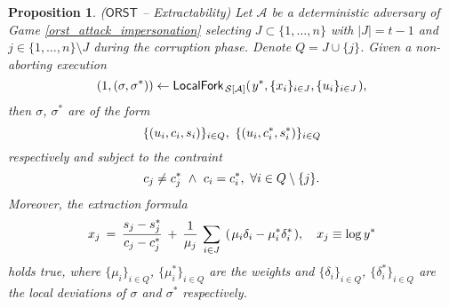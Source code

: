 \documentclass[psamsfonts, reqno]{amsart}
\newtheorem{prop}[thm]{Proposition}
\theoremstyle{definition}
\theoremstyle{remark}
\numberwithin{equation}{section}
\begin{document}
\begin{prop}\label{orst_extractability_prop}
\textup{($\mathsf{ORST}$ -- \textup{Extractability})}
Let $\mathcal{A}$ be a deterministic adversary of
Game \ref{orst_attack_impersonation}
selecting $J \subset \{1, \dots, n\}$ with $|J| = t-1$
and $j \in \{1, \dots, n\} \setminus J$ during the corruption
phase. Denote $Q = J \cup \{j\}$.
Given a non-aborting execution
\vspace{5pt}
\begin{equation*}
	(1, (\sigma, \sigma^*)) \leftarrow
	\mathsf{LocalFork}_{\hspace{1pt}\mathcal{S[\mathcal{A}]}}
		(\hspace{1pt}
			y^*,
			\{x_i\}_{i \in J},
			\{u_i\}_{i \in J}
		\hspace{1pt}),
	\vspace{5pt}
\end{equation*}
then $\sigma$, $\sigma^*$ are of the form
\vspace{5pt}
\begin{equation}\label{orst_forked_proofs}
\{(u_i, c_i, s_i)\}_{i \in Q},\ \{(u_i, c_i^*, s_i^*)\}_{i \in Q}
\vspace{5pt}
\end{equation}
respectively and subject to the contraint
\vspace{8pt}
\begin{equation}\label{orst_forked_challenges}
c_j \neq c_j^*
\ \land
\ c_i = c_i^*,\ \forall i \in Q \setminus \{j\}.
\vspace{8pt}
\end{equation}
Moreover, the extraction formula
\vspace{8pt}
\begin{equation}\label{orst_extraction}
	x_j
	\hspace{2pt}=\hspace{2pt}
	\frac{s_j - s_j^*}{c_j - c_j^*}
	\hspace{2pt}+\hspace{2pt}
	\frac{1}{\mu_j}\hspace{2pt}
	\sum_{i \in J}\hspace{4pt}
	(\hspace{1pt}
		\mu_i \delta_i -
		\mu_i^* \delta_i^*
	\hspace{1pt}),
	\ \ \ x_j \equiv \log y^*
\vspace{5pt}
\end{equation}
holds true,
where $\{\mu_i\}_{i \in Q}$, $\{\mu_i^*\}_{i \in Q}$
are the weights and
$\{\delta_i\}_{i \in Q}$, $\{\delta_i^*\}_{i \in Q}$
are the local deviations of
$\sigma$ and $\sigma^*$ respectively.
\end{prop}
\end{document}
